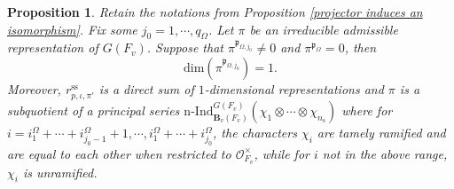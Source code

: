 \documentclass[12pt,oneside,reqno]{amsart}
\theoremstyle{plain}
\newtheorem{proposition}[theorem]{Proposition}
\begin{document}
	\begin{proposition}\label{parahoric invariant subspace is one-dimensional}
		Retain the notations from
		Proposition
		\ref{projector induces an isomorphism}.
		Fix some
		$j_0=1,\cdots,q_\Omega$.
		Let
		$\pi$ be an irreducible admissible representation of
		$ G(F_v)$.
		Suppose that
		$\pi^{\mathfrak{p}_{\Omega,j_0}}\ne0$
		and
		$\pi^{\mathfrak{p}_\Omega}=0$, then
		\[
		\mathrm{dim}(\pi^{\mathfrak{p}_{\Omega,j_0}})=1.
		\]
		Moreover,
		$r_{p,\iota,\pi'}^\mathrm{ss}$
		is a direct sum of $1$-dimensional representations
		and
		$\pi$ is a subquotient of a principal series
		$\mathrm{n}\text{-}\mathrm{Ind}_{\mathbf{B}_v(F_v)}^{ G(F_v)}
		(\chi_1\otimes\cdots\otimes\chi_{n_\mathrm{s}})$
		where
		for
		$i=i^\Omega_1+\cdots+i^\Omega_{j_0-1}+1,
		\cdots,
		i^\Omega_1+\cdots+i^\Omega_{j_0}$,
		the characters $\chi_i$
		are tamely ramified 
		and are equal to each other when restricted to
		$\mathcal{O}_{F_v}^\times$,
		while for $i$ not in the above range,
		$\chi_i$ is unramified.
	\end{proposition}
\end{document}
